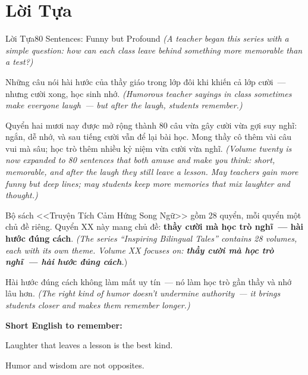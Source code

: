 \chapter*{Lời Tựa}

\begin{truyen}{Lời Tựa}{80 Sentences: Funny but Profound}
\textit{(A teacher began this series with a simple question: how can each class leave behind something more memorable than a test?)}

Những câu nói hài hước của thầy giáo trong lớp đôi khi khiến cả lớp cười~--- nhưng cười xong, học sinh nhớ.
\textit{(Humorous teacher sayings in class sometimes make everyone laugh~--- but after the laugh, students remember.)}

Quyển hai mươi nay được mở rộng thành 80 câu vừa gây cười vừa gợi suy nghĩ: ngắn, dễ nhớ, và sau tiếng cười vẫn để lại bài học. Mong thầy cô thêm vài câu vui mà sâu; học trò thêm nhiều kỷ niệm vừa cười vừa nghĩ.
\textit{(Volume twenty is now expanded to 80 sentences that both amuse and make you think: short, memorable, and after the laugh they still leave a lesson. May teachers gain more funny but deep lines; may students keep more memories that mix laughter and thought.)}

Bộ sách <<Truyện Tích Cảm Hứng Song Ngữ>> gồm 28 quyển, mỗi quyển một chủ đề riêng. Quyển XX này mang chủ đề: \textbf{thầy cười mà học trò nghĩ~--- hài hước đúng cách}.
\textit{(The series ``Inspiring Bilingual Tales'' contains 28 volumes, each with its own theme. Volume XX focuses on: \textbf{thầy cười mà học trò nghĩ~--- hài hước đúng cách}.})
\end{truyen}

\begin{baihoc}
Hài hước đúng cách không làm mất uy tín~--- nó làm học trò gần thầy và nhớ lâu hơn.
\textit{(The right kind of humor doesn't undermine authority~--- it brings students closer and makes them remember longer.)}
\end{baihoc}

\begin{ghinhoanh}
\textbf{Short English to remember:}

Laughter that leaves a lesson is the best kind.

Humor and wisdom are not opposites.
\end{ghinhoanh}

